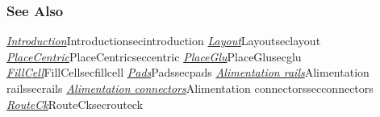 \subsubsection{See Also}

\hyperref[ref]{\emph{Introduction}}{}{Introduction}{secintroduction}
\hyperref[ref]{\emph{Layout}}{}{Layout}{seclayout}
\hyperref[ref]{\emph{PlaceCentric}}{}{PlaceCentric}{seccentric}
\hyperref[ref]{\emph{PlaceGlu}}{}{PlaceGlu}{secglu}
\hyperref[ref]{\emph{FillCell}}{}{FillCell}{secfillcell}
\hyperref[ref]{\emph{Pads}}{}{Pads}{secpads}
\hyperref[ref]{\emph{Alimentation rails}}{}{Alimentation rails}{secrails}
\hyperref[ref]{\emph{Alimentation connectors}}{}{Alimentation connectors}{secconnectors}
\hyperref[ref]{\emph{RouteCk}}{}{RouteCk}{secrouteck}
